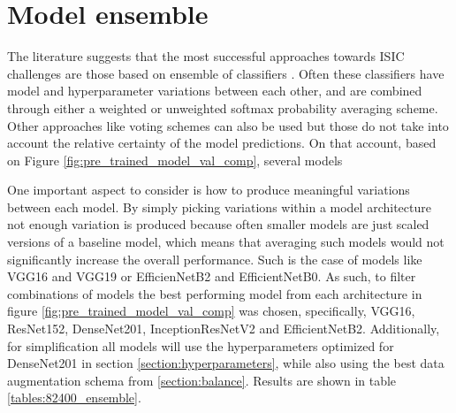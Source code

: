     
\section{Model ensemble} \label{section:ensemble}
    The literature suggests that the most successful approaches towards ISIC challenges are those based on ensemble of classifiers \cite{humanvsisic2018}. Often these classifiers have model and hyperparameter variations between each other, and are combined through either a weighted or unweighted softmax probability averaging scheme. Other approaches like voting schemes can also be used but those do not take into account the relative certainty of the model predictions. On that account, based on Figure \ref{fig:pre_trained_model_val_comp}, several models \par
    
    One important aspect to consider is how to produce meaningful variations between each model. By simply picking variations within a model architecture not enough variation is produced because often smaller models are just scaled versions of a baseline model, which means that averaging such models would not significantly increase the overall performance. Such is the case of models like VGG16 and VGG19 or EfficienNetB2 and EfficientNetB0. As such, to filter combinations of models the best performing model from each architecture in figure \ref{fig:pre_trained_model_val_comp} was chosen, specifically, VGG16, ResNet152, DenseNet201, InceptionResNetV2 and EfficientNetB2. Additionally, for simplification all models will use the hyperparameters optimized for DenseNet201 in section \autoref{section:hyperparameters}, while also using the best data augmentation schema from \autoref{section:balance}. Results are shown in table \ref{tables:82400_ensemble}. \par
    
